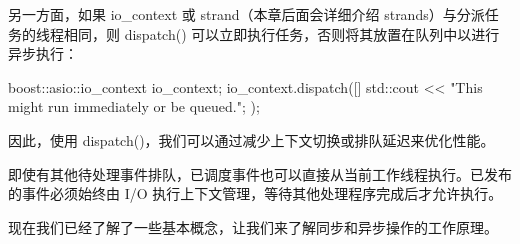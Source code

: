 另一方面，如果 io\_context 或 strand（本章后面会详细介绍 strands）与分派任务的线程相同，则 dispatch() 可以立即执行任务，否则将其放置在队列中以进行异步执行：

\begin{cpp}
boost::asio::io_context io_context;
io_context.dispatch([] {
    std::cout << "This might run immediately or be queued.\n";
});
\end{cpp}

因此，使用 dispatch()，我们可以通过减少上下文切换或排队延迟来优化性能。

即使有其他待处理事件排队，已调度事件也可以直接从当前工作线程执行。已发布的事件必须始终由 I/O 执行上下文管理，等待其他处理程序完成后才允许执行。

现在我们已经了解了一些基本概念，让我们来了解同步和异步操作的工作原理。











